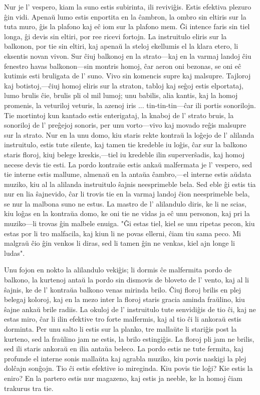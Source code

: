 \documentclass[ngerman,12pt,twoside]{book}
\begin{document}
Nur je l' vespero, kiam la suno estis subirinta, ili reviviĝis. Estis efektiva plezuro ĝin vidi. Apenaŭ lumo estis enportita en la ĉambron, la ombro sin eltiris sur la tuta muro, ĝis la plafono kaj eĉ iom sur la plafono mem. Ĝi intence faris sin tiel longa, ĝi devis sin eltiri, por ree ricevi fortojn. La instruitulo eliris sur la balkonon, por tie sin eltiri, kaj apenaŭ la steloj ekellumis el la klara etero, li eksentis novan vivon. Sur ĉiuj balkonoj en la strato---kaj en la varmaj landoj ĉiu fenestro havas balkonon---sin montris homoj, ĉar aeron oni bezonas, se oni eĉ kutimis esti bruligata de l' suno. Vivo sin komencis supre kaj malsupre. Tajloroj kaj botistoj,---ĉiuj homoj eliris sur la straton, tabloj kaj seĝoj estis elportataj, lumo brulis ĉie, brulis pli ol mil lumoj; unu babilis, alia kantis, kaj la homoj promenis, la veturiloj veturis, la azenoj iris ... tin-tin-tin---ĉar ili portis sonorilojn. Tie mortintoj kun kantado estis enterigataj, la knaboj de l' strato bruis, la sonoriloj de l' preĝejoj sonoris, per unu vorto---vivo kaj movado reĝis malsupre sur la strato. Nur en la unu domo, kiu staris rekte kontraŭ la loĝejo de l' alilanda instruitulo, estis tute silente, kaj tamen tie kredeble iu loĝis, ĉar sur la balkono staris floroj, kiuj belege kreskis,---tiel iu kredeble ilin superverŝadis, kaj homoj necese devis tie esti. La pordo kontraŭe estis ankaŭ malfermata je l' vespero, sed tie interne estis mallume, almenaŭ en la antaŭa ĉambro,---el interne estis aŭdata muziko, kiu al la alilanda instruitulo ŝajnis neesprimeble bela. Sed eble ĝi estis tia nur en lia ŝajnevido, ĉar li trovis tie en la varmaj landoj ĉion neesprimeble bela, se nur la malbona suno ne estus. La mastro de l' alilandulo diris, ke li ne scias, kiu loĝas en la kontraŭa domo, ke oni tie ne vidas ja eĉ unu personon, kaj pri la muziko---li trovas ĝin malbele enuiga. "Ĝi estas tiel, kiel se unu ripetas pecon, kiu estas por li tro malfacila, kaj kiun li ne povas ellerni, ĉiam tiu sama peco. \glqq{}Mi malgraŭ ĉio ĝin venkos\grqq{} li diras, sed li tamen ĝin ne venkas, kiel ajn longe li ludas".

Unu fojon en nokto la alilandulo vekiĝis; li dormis ĉe malfermita pordo de balkono, la kurtenoj antaŭ la pordo sin dismovis de bloveto de l' vento, kaj al li ŝajnis, ke de l' kontraŭa balkono venas mirinda brilo. Ĉiuj floroj brilis en plej belegaj koloroj, kaj en la mezo inter la floroj staris gracia aminda fraŭlino, kiu ŝajne ankaŭ brile radiis. La okuloj de l' instruitulo tute senvidiĝis de tio ĉi, kaj ne estas miro, ĉar li ilin efektive tro forte malfermis, kaj al tio ĉi li ankoraŭ estis dorminta. Per unu salto li estis sur la planko, tre mallaŭte li stariĝis post la kurteno, sed la fraŭlino jam ne estis, la brilo estingiĝis. La floroj pli jam ne brilis, sed ili staris ankoraŭ en ilia antaŭa beleco. La pordo estis ne tute fermita, kaj profunde el interne sonis mallaŭta kaj agrabla muziko, kiu povis naskigi la plej dolĉajn sonĝojn. Tio ĉi estis efektive io mireginda. Kiu povis tie loĝi? Kie estis la eniro? En la partero estis nur magazeno, kaj estis ja neeble, ke la homoj ĉiam trakurus tra tie.
\end{document}
